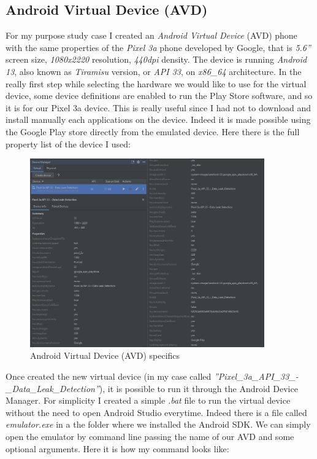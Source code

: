 		\subsection{Android Virtual Device (AVD)}
			\par For my purpose study case I created an \textit{Android Virtual Device} (AVD) phone with the same properties of the \textit{Pixel 3a} phone developed by Google, that is \textit{5.6''} screen size, \textit{1080x2220} resolution, \textit{440dpi} density. The device is running \textit{Android 13}, also known as \textit{Tiramisu} version, or \textit{API 33}, on \textit{x86\_64} architecture. In the really first step while selecting the hardware we would like to use for the virtual device, some device definitions are enabled to run the Play Store software, and so it is for our Pixel 3a device. This is really useful since I had not to download and install manually each applications on the device. Indeed it is made possible using the Google Play store directly from the emulated device. Here there is the full property list of the device I used:
			\begin{figure}[ht]    
				\centering   
				\includegraphics[width=0.9\textwidth]{./images/avd_splitted.png}
			    	\caption{Android Virtual Device (AVD) specifics}
			\end{figure}
			\par Once created the new virtual device (in my case called \textit{''Pixel\_3a\_API\_33\_-\_Data\_Leak\_Detection''}), it is possible to run it through the Android Device Manager. For simplicity I created a simple \textit{.bat} file to run the virtual device without the need to open Android Studio everytime. Indeed there is a file called \textit{emulator.exe} in a the folder where we installed the Android SDK. We can simply open the emulator by command line passing the name of our AVD and some optional arguments. Here it is how my command looks like:
